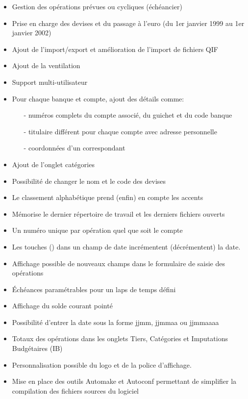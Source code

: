 \begin{itemize}
	\item Gestion des opérations prévues ou cycliques (échéancier) 
	\item Prise en charge des devises et du passage à l'euro (du 1er janvier 1999 au 1er janvier 2002)
	\item Ajout de l'import/export et amélioration de l'import de fichiers \gls{QIF}
	\item Ajout de la ventilation
	\item Support multi-utilisateur
	\item Pour chaque banque et compte, ajout des détails comme:
		\begin{itemize}
		\item[-] numéros complets du compte associé, du guichet et du code banque
		\item[-] titulaire différent pour chaque compte avec adresse personnelle
		\item[-] coordonnées d'un correspondant
		\end{itemize}
	\item Ajout de l'onglet catégories
	\item Possibilité de changer le nom et le code des devises
	\item Le classement alphabétique prend (enfin) en compte les accents
	\item Mémorise le dernier répertoire de travail et les derniers fichiers ouverts
	\item Un numéro unique par opération quel que soit le compte
	\item Les touches \key{+} (\key{-}) dans un champ de date incrémentent (décrémentent)
	la date.
	\item Affichage possible de nouveaux champs dans le formulaire de saisie des opérations 
	\item Échéances paramétrables pour un laps de temps défini
	\item Affichage du solde courant pointé
	\item Possibilité d'entrer la date sous la forme jjmm, jjmmaa ou jjmmaaaa
	\item Totaux des opérations dans les onglets Tiers, Catégories et Imputations Budgétaires (IB)
	\item Personnalisation possible du logo et de la police d'affichage.
	\item Mise en place des outils Automake et Autoconf permettant de simplifier la compilation des fichiers sources du logiciel
\end{itemize}

